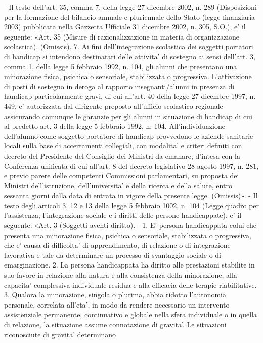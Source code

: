     - Il testo dell'art. 35, comma 7, della legge 27 dicembre 2002, n. 289 (Disposizioni per la formazione del bilancio annuale e pluriennale dello Stato (legge finanziaria 2003) pubblicata nella Gazzetta Ufficiale 31 dicembre 2002, n. 305, S.O.), e' il seguente: «Art. 35 (Misure di razionalizzazione in materia di organizzazione scolastica). (Omissis). 7. Ai fini dell'integrazione scolastica dei soggetti portatori di handicap si intendono destinatari delle attivita' di sostegno ai sensi dell'art. 3, comma 1, della legge 5 febbraio 1992, n. 104, gli alunni che presentano una minorazione fisica, psichica o sensoriale, stabilizzata o progressiva. L'attivazione di posti di sostegno in deroga al rapporto insegnanti/alunni in presenza di handicap particolarmente gravi, di cui all'art. 40 della legge 27 dicembre 1997, n. 449, e' autorizzata dal dirigente preposto all'ufficio scolastico regionale assicurando comunque le garanzie per gli alunni in situazione di handicap di cui al predetto art. 3 della legge 5 febbraio 1992, n. 104. All'individuazione dell'alunno come soggetto portatore di handicap provvedono le aziende sanitarie locali sulla base di accertamenti collegiali, con modalita' e criteri definiti con decreto del Presidente del Consiglio dei Ministri da emanare, d'intesa con la Conferenza unificata di cui all'art. 8 del decreto legislativo 28 agosto 1997, n. 281, e previo parere delle competenti Commissioni parlamentari, su proposta dei Ministri dell'istruzione, dell'universita' e della ricerca e della salute, entro sessanta giorni dalla data di entrata in vigore della presente legge. (Omissis)».
    - Il testo degli articoli 3, 12 e 13 della legge 5 febbraio 1002, n. 104 (Legge quadro per l'assistenza, l'integrazione sociale e i diritti delle persone handicappate), e' il seguente: «Art. 3 (Soggetti aventi diritto). - 1. E' persona handicappata colui che presenta una minorazione fisica, psichica o sensoriale, stabilizzata o progressiva, che e' causa di difficolta' di apprendimento, di relazione o di integrazione lavorativa e tale da determinare un processo di svantaggio sociale o di emarginazione. 2. La persona handicappata ha diritto alle prestazioni stabilite in suo favore in relazione alla natura e alla consistenza della minorazione, alla capacita' complessiva
    individuale residua e alla efficacia delle terapie riabilitative. 3. Qualora la minorazione, singola o plurima, abbia ridotto l'autonomia personale, correlata all'eta', in modo da rendere necessario un intervento assistenziale permanente, continuativo e globale nella sfera individuale o in quella di relazione, la situazione assume connotazione di gravita'. Le situazioni riconosciute di gravita' determinano
